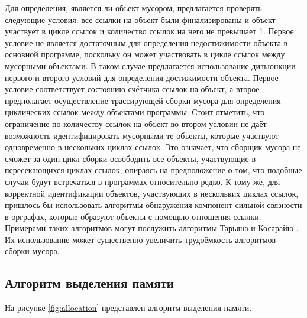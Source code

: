 Для определения, является ли объект мусором, предлагается проверять следующие условия: все ссылки на объект были финализированы и объект участвует в цикле ссылок и количество ссылок на него не превышает 1. Первое условие не является достаточным для определения недостижимости объекта в основной программе, поскольку он может участвовать в цикле ссылок между мусорными объектами. В таком случае предлагается использование дизъюнкции первого и второго условий для определения достижимости объекта. Первое условие соответствует состоянию счётчика ссылок на объект, а второе предполагает осуществление трассирующей сборки мусора для определения циклических ссылок между объектами программы. Стоит отметить, что ограничение по количеству ссылок на объект во втором условии не даёт возможность идентифицировать мусорными те объекты, которые участвуют одновременно в нескольких циклах ссылок. Это означает, что сборщик мусора не сможет за один цикл сборки освободить все объекты, участвующие в пересекающихся циклах ссылок, опираясь на предположение о том, что подобные случаи будут встречаться в программах относительно редко. К тому же, для корректной идентификации объектов, участвующих в нескольких циклах ссылок, пришлось бы использовать алгоритмы обнаружения компонент сильной связности в орграфах, которые образуют объекты с помощью отношения ссылки. Примерами таких алгоритмов могут послужить алгоритмы Тарьяна и Косарайю \cite{graph_algorithms}. Их использование может существенно увеличить трудоёмкость алгоритмов сборки мусора.

\subsection{Алгоритм выделения памяти}

На рисунке \ref{fig:allocation} представлен алгоритм выделения памяти.

